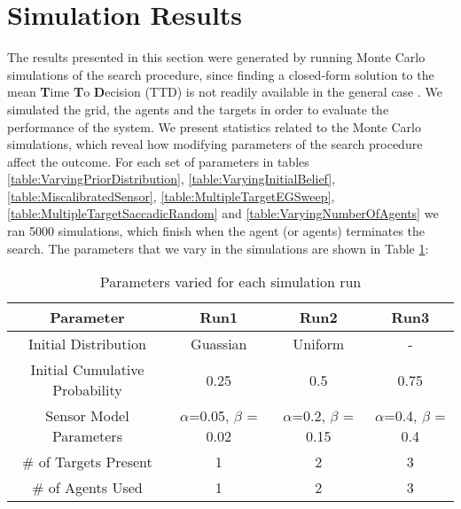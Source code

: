 \section{Simulation Results}



The results presented in this section were generated by running Monte Carlo simulations of the search procedure, since finding a closed-form solution to the mean \textbf{T}ime \textbf{T}o \textbf{D}ecision (TTD) is not readily available in the general case \cite{Chung2012AnalysisStrategies}. We simulated the grid, the agents and the targets in order to evaluate the performance of the system.
We present statistics related to the Monte Carlo simulations, which reveal how modifying parameters of the search procedure affect the outcome. For each set of parameters in tables \ref{table:VaryingPriorDistribution}, \ref{table:VaryingInitialBelief}, \ref{table:MiscalibratedSensor}, \ref{table:MultipleTargetEGSweep}, \ref{table:MultipleTargetSaccadicRandom} and \ref{table:VaryingNumberOfAgents} we ran 5000 simulations, which finish when the agent (or agents) terminates the search. The parameters that we vary in the simulations are shown in Table \ref{table:SimRunParameters}: 

\begin{table}[H]
    \centering
    \begin{tabular}{|c|c|c|c|}
    \hline
         Parameter&  Run1 & Run2 & Run3 \\
         \hline
         Initial Distribution & Guassian & Uniform & - \\
         
         \hline
         Initial Cumulative Probability & 0.25 & 0.5 & 0.75 \\
         
         \hline
         Sensor Model Parameters & $\alpha$=0.05, $\beta$ = 0.02 & $\alpha$=0.2, $\beta$ = 0.15 &
         $\alpha$=0.4, $\beta$ = 0.4 \\
         
         \hline
         \# of Targets Present & 1 & 2 & 3 \\
         
         \hline
         \# of Agents Used & 1 & 2 & 3 \\
         
         \hline
    \end{tabular}
    \caption{Parameters varied for each simulation run}
    \label{table:SimRunParameters}
\end{table}

